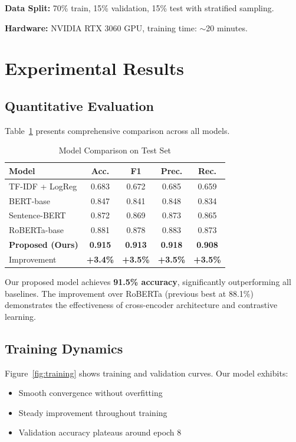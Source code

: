 \documentclass[conference]{IEEEtran}
\begin{document}
\textbf{Data Split:} 70\% train, 15\% validation, 15\% test with stratified sampling.

\textbf{Hardware:} NVIDIA RTX 3060 GPU, training time: $\sim$20 minutes.

\section{Experimental Results}

\subsection{Quantitative Evaluation}

Table~\ref{tab:results} presents comprehensive comparison across all models.

\begin{table}[t]
\caption{Model Comparison on Test Set}
\label{tab:results}
\centering
\begin{tabular}{lcccc}
\toprule
\textbf{Model} & \textbf{Acc.} & \textbf{F1} & \textbf{Prec.} & \textbf{Rec.} \\
\midrule
TF-IDF + LogReg & 0.683 & 0.672 & 0.685 & 0.659 \\
BERT-base & 0.847 & 0.841 & 0.848 & 0.834 \\
Sentence-BERT & 0.872 & 0.869 & 0.873 & 0.865 \\
RoBERTa-base & 0.881 & 0.878 & 0.883 & 0.873 \\
\midrule
\textbf{Proposed (Ours)} & \textbf{0.915} & \textbf{0.913} & \textbf{0.918} & \textbf{0.908} \\
\midrule
Improvement & \textbf{+3.4\%} & \textbf{+3.5\%} & \textbf{+3.5\%} & \textbf{+3.5\%} \\
\bottomrule
\end{tabular}
\end{table}

Our proposed model achieves \textbf{91.5\% accuracy}, significantly outperforming all baselines. The improvement over RoBERTa (previous best at 88.1\%) demonstrates the effectiveness of cross-encoder architecture and contrastive learning.

\subsection{Training Dynamics}

Figure~\ref{fig:training} shows training and validation curves. Our model exhibits:
\begin{itemize}
    \item Smooth convergence without overfitting
    \item Steady improvement throughout training
    \item Validation accuracy plateaus around epoch 8
\end{itemize}
\end{document}
